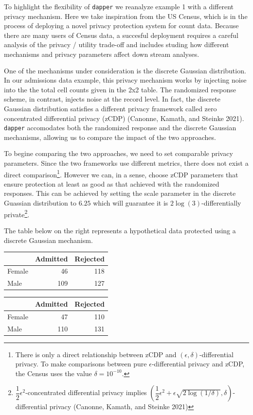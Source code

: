 To highlight the flexibility of \texttt{dapper} we reanalyze example 1
with a different privacy mechanism. Here we take inspiration from the US Census,
which is in the process of deploying a novel privacy protection system for count data.
Because there are many users of Census data, a succesful deployment requires
a careful analysis of the privacy / utility trade-off and includes
studing how different mechanisms and privacy parameters affect
down stream analyses.

One of the mechanisms under consideration is the discrete Gaussian distribution.
In our admissions data example, this privacy mechanism works by injecting
noise into the the total cell counts given in the 2x2 table. The
randomized response scheme, in contrast, injects noise at the record level.
In fact, the discrete Gaussian distribution satisfies a different privacy framework called
zero concentrated differential privacy (zCDP) (Canonne, Kamath, and Steinke 2021).
\texttt{dapper} accomodates both the randomized response and
the discrete Gaussian mechanisms, allowing us to compare the impact
of the two approaches.

To begine comparing the two approaches, we need to set comparable privacy parameters.
Since the two frameworks use different metrics, there does not exist
a direct comparison\footnote{There is only a direct relationship between zCDP and \((\epsilon, \delta)\)-differential privacy. To make comparisons between pure \(\epsilon\)-differential privacy and zCDP, the Census uses the value \(\delta = 10^{-10}\).}. However we can, in a sense, choose zCDP parameters that ensure
protection at least as good as that achieved with the randomized responses. This
can be achieved by setting the scale parameter in the discrete Guassian
distribution to \(6.25\) which will guarantee it is \(2\log(3)\)-differentially private\footnote{\(\dfrac{1}{2} \epsilon^2\)-concentrated differential privacy implies \(\left(\dfrac{1}{2}\epsilon^2 + \epsilon \sqrt{2\log(1/\delta)}, \delta\right)\)-differential privacy (Canonne, Kamath, and Steinke 2021)}.

The table below on the right represents a hypothetical data protected using a discrete
Gaussian mechanism.

\begin{table}[!h]
\centering
\centering
\begin{tabular}[t]{lrr}
\toprule
  & Admitted & Rejected\\
\midrule
Female & 46 & 118\\
Male & 109 & 127\\
\bottomrule
\end{tabular}
\centering
\begin{tabular}[t]{lrr}
\toprule
  & Admitted & Rejected\\
\midrule
Female & 47 & 110\\
Male & 110 & 131\\
\bottomrule
\end{tabular}
\end{table}

